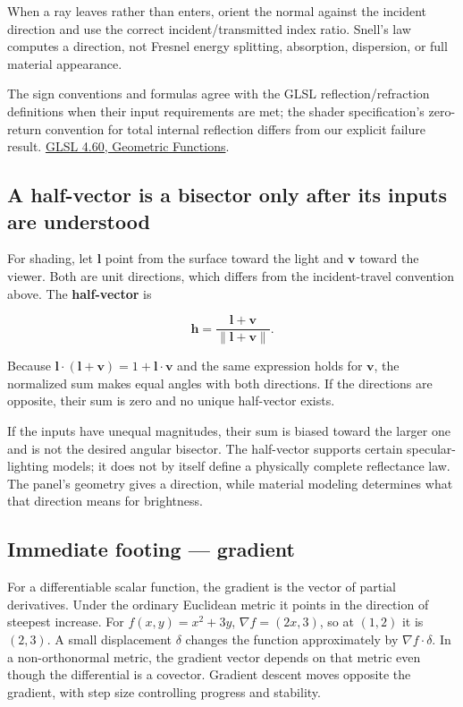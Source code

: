 When a ray leaves rather than enters, orient the normal against the incident direction and use the correct incident/transmitted index ratio. Snell's law computes a direction, not Fresnel energy splitting, absorption, dispersion, or full material appearance.

The sign conventions and formulas agree with the GLSL reflection/refraction definitions when their input requirements are met; the shader specification's zero-return convention for total internal reflection differs from our explicit failure result. \href{https://registry.khronos.org/OpenGL/specs/gl/GLSLangSpec.4.60.html\#geometric-functions}{GLSL 4.60, Geometric Functions}.

\subsection{A half-vector is a bisector only after its inputs are understood}\label{01-foundations-i-ch018-a-half-vector-is-a-bisector-only-after-its-inputs-are-understood}

For shading, let \(\mathbf l\) point from the surface toward the light and \(\mathbf v\) toward the viewer. Both are unit directions, which differs from the incident-travel convention above. The \textbf{half-vector} is

\[
\mathbf h=\frac{\mathbf l+\mathbf v}{\|\mathbf l+\mathbf v\|}.
\]

Because \(\mathbf l\cdot(\mathbf l+\mathbf v)=1+\mathbf l\cdot\mathbf v\) and the same expression holds for \(\mathbf v\), the normalized sum makes equal angles with both directions. If the directions are opposite, their sum is zero and no unique half-vector exists.

If the inputs have unequal magnitudes, their sum is biased toward the larger one and is not the desired angular bisector. The half-vector supports certain specular-lighting models; it does not by itself define a physically complete reflectance law. The panel's geometry gives a direction, while material modeling determines what that direction means for brightness.

\subsection{Immediate footing --- gradient}\label{01-foundations-i-ch018-immediate-footing-gradient}

For a differentiable scalar function, the gradient is the vector of partial derivatives. Under the ordinary Euclidean metric it points in the direction of steepest increase. For \(f(x,y)=x^2+3y\), \(\nabla f=(2x,3)\), so at \((1,2)\) it is \((2,3)\). A small displacement \(\delta\) changes the function approximately by \(\nabla f\cdot\delta\). In a non-orthonormal metric, the gradient vector depends on that metric even though the differential is a covector. Gradient descent moves opposite the gradient, with step size controlling progress and stability.

